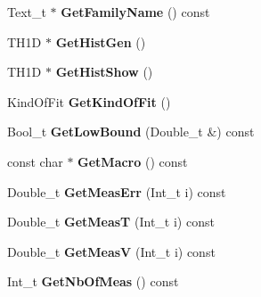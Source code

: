 \begin{DoxyCompactItemize}
\item 
\hypertarget{classTSplineFit_ad692f4353135dc5ae5c98f1d496a5c5c}{Text\-\_\-t $\ast$ {\bfseries Get\-Family\-Name} () const }\label{classTSplineFit_ad692f4353135dc5ae5c98f1d496a5c5c}

\item 
\hypertarget{classTSplineFit_a820f3208fdc14419dc651018b3f8341f}{T\-H1\-D $\ast$ {\bfseries Get\-Hist\-Gen} ()}\label{classTSplineFit_a820f3208fdc14419dc651018b3f8341f}

\item 
\hypertarget{classTSplineFit_ac914b6b4a3bede53e1989e70a910d703}{T\-H1\-D $\ast$ {\bfseries Get\-Hist\-Show} ()}\label{classTSplineFit_ac914b6b4a3bede53e1989e70a910d703}

\item 
\hypertarget{classTSplineFit_a82a16cf72c9074dfe6a924c3aa5a6340}{Kind\-Of\-Fit {\bfseries Get\-Kind\-Of\-Fit} ()}\label{classTSplineFit_a82a16cf72c9074dfe6a924c3aa5a6340}

\item 
\hypertarget{classTSplineFit_a10613c9010c8bd8a111eacb519add2d5}{Bool\-\_\-t {\bfseries Get\-Low\-Bound} (Double\-\_\-t \&) const }\label{classTSplineFit_a10613c9010c8bd8a111eacb519add2d5}

\item 
\hypertarget{classTSplineFit_aa449bda774d67ef1fdaebff5757885a5}{const char $\ast$ {\bfseries Get\-Macro} () const }\label{classTSplineFit_aa449bda774d67ef1fdaebff5757885a5}

\item 
\hypertarget{classTSplineFit_a5777e2a131c9bb3c39c4421c45620f44}{Double\-\_\-t {\bfseries Get\-Meas\-Err} (Int\-\_\-t i) const }\label{classTSplineFit_a5777e2a131c9bb3c39c4421c45620f44}

\item 
\hypertarget{classTSplineFit_a7173a0d1a487120d857de92a5e4ffd02}{Double\-\_\-t {\bfseries Get\-Meas\-T} (Int\-\_\-t i) const }\label{classTSplineFit_a7173a0d1a487120d857de92a5e4ffd02}

\item 
\hypertarget{classTSplineFit_ac27dcd985ce537cbd87fe041328c18ea}{Double\-\_\-t {\bfseries Get\-Meas\-V} (Int\-\_\-t i) const }\label{classTSplineFit_ac27dcd985ce537cbd87fe041328c18ea}

\item 
\hypertarget{classTSplineFit_ac3b068e4d4dca5f5cf104f0a748290c4}{Int\-\_\-t {\bfseries Get\-Nb\-Of\-Meas} () const }\label{classTSplineFit_ac3b068e4d4dca5f5cf104f0a748290c4}


\end{DoxyCompactItemize}
